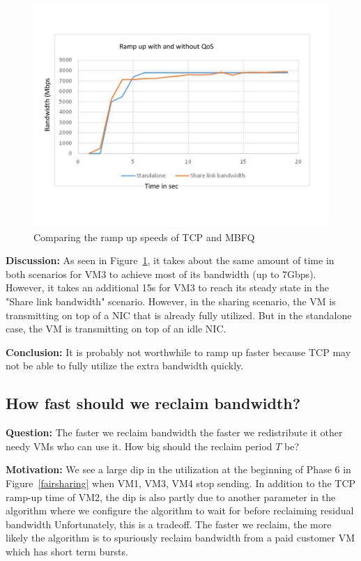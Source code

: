 \begin{figure}[h]
\centering
\includegraphics[width=\columnwidth,trim=60pt 40mm 0pt 8mm]{figures/rampupcomparison}
\caption{Comparing the ramp up speeds of TCP and MBFQ}
\label{rampupcomparison}
\vspace{-3mm}
\end{figure}

{\bf Discussion:} As seen in Figure~\ref{rampupcomparison}, it takes about the
same amount of time in both scenarios for VM3 to achieve most of its bandwidth
(up to 7Gbps). However, it takes an additional 15s for VM3 to reach its steady
state  in the "Share link bandwidth" scenario. However, in the sharing scenario,
the VM is transmitting on top of a NIC that is already fully utilized.
But in the standalone case, the VM is transmitting on top of an idle NIC. 

{\bf Conclusion:} It is probably not worthwhile 
to ramp up faster because TCP may not be able to fully utilize the extra
bandwidth quickly.

\subsection{How fast should we reclaim bandwidth?}
{\bf Question:}  The faster we reclaim bandwidth the
faster we redistribute it other needy VMs who can use it. How big should the
reclaim period $T$ be?

{\bf Motivation:} 
We see a large dip in the utilization at the beginning of Phase 6 in
Figure~\ref{fairsharing} when VM1, VM3, VM4 stop sending.  In addition to the
TCP ramp-up time of VM2, the dip is also partly due to another parameter in the
algorithm where we configure the algorithm to wait for  before
reclaiming residual bandwidth  Unfortunately, this is a tradeoff.  The faster we
reclaim, the more likely the algorithm is to spuriously reclaim bandwidth from a
paid customer VM which has short term bursts.

